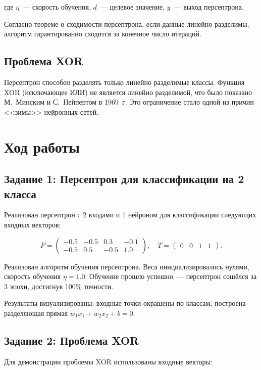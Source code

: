 \documentclass[14pt,a4paper]{extarticle}
\begin{document}
где $\eta$~--- скорость обучения, $d$~--- целевое значение, $y$~--- выход персептрона.

Согласно теореме о сходимости персептрона, если данные линейно разделимы, алгоритм гарантированно сходится за конечное число итераций.

\subsection{Проблема XOR}

Персептрон способен разделять только линейно разделимые классы. Функция XOR (исключающее ИЛИ) не является линейно разделимой, что было показано М.~Минским и С.~Пейпертом в 1969~г. Это ограничение стало одной из причин <<зимы>> нейронных сетей.

\section{Ход работы}

\subsection{Задание 1: Персептрон для классификации на 2 класса}

Реализован персептрон с 2 входами и 1 нейроном для классификации следующих входных векторов:

\begin{equation}
P = \begin{pmatrix} -0.5 & -0.5 & 0.3 & -0.1 \\ -0.5 & 0.5 & -0.5 & 1.0 \end{pmatrix}, \quad
T = \begin{pmatrix} 0 & 0 & 1 & 1 \end{pmatrix}.
\end{equation}

Реализован алгоритм обучения персептрона. Веса инициализировались нулями, скорость обучения $\eta = 1.0$. Обучение прошло успешно~--- персептрон сошёлся за 3 эпохи, достигнув 100\% точности.

Результаты визуализированы: входные точки окрашены по классам, построена разделяющая прямая $w_1 x_1 + w_2 x_2 + b = 0$.

\subsection{Задание 2: Проблема XOR}

Для демонстрации проблемы XOR использованы входные векторы:
\end{document}
